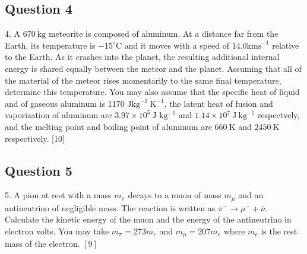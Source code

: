 \documentclass{article}
\begin{document}
\subsection{Question 4}
4. A $670 \mathrm{~kg}$ meteorite is composed of aluminum. At a distance far from the Earth, its temperature is $-15^{\circ} \mathrm{C}$ and it moves with a speed of $14.0 \mathrm{ kms}^{-1}$ relative to the Earth. As it crashes into the planet, the resulting additional internal energy is shared equally between the meteor and the planet. Assuming that all of the material of the meteor rises momentarily to the same final temperature, determine this temperature. You may also assume that the specific heat of liquid and of gaseous aluminum is 1170 $\mathrm{Jkg}^{-1} \mathrm{~K}^{-1}$, the latent heat of fusion and vaporization of aluminum are $3.97 \times 10^{5} \mathrm{~J}$ $\mathrm{kg}^{-1}$ and $1.14 \times 10^{7} \mathrm{~J} \mathrm{~kg}^{-1}$ respectvely, and the melting point and boiling point of aluminum are $660 \mathrm{~K}$ and $2450 \mathrm{~K}$ respectively.
[10]

\subsection{Question 5}
5. A pion at rest with a mass $m_{\pi}$ decays to a muon of mass $m_{\mu}$ and an antineutrino of negligible mass. The reaction is written as $\pi^{-} \rightarrow \mu^{-}+\bar{\nu}$. Calculate the kinetic energy of the muon and the energy of the antineutrino in electron volts. You may take $m_{\pi}=273 m_{e}$ and $m_{\mu}=207 m_{e}$ where $m_{e}$ is the rest mass of the electron.
$[9]$
\end{document}
